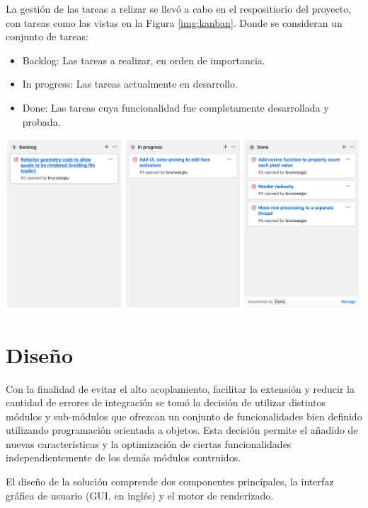 La gestión de las tareas a relizar se llevó a cabo en el respositiorio del proyecto, con tareas como las vistas en la Figura \ref{img:kanban}. Donde se consideran un conjunto de tareas:

\begin{itemize}
	\item Backlog: Las tareas a realizar, en orden de importancia.
	\item In progress: Las tareas actualmente en desarrollo.
	\item Done: Las tareas cuya funcionalidad fue completamente desarrollada y probada.
\end{itemize}

\vspace{5mm}
\begin{minipage}[h]{0.8\linewidth}
	\centering
	\includegraphics[width=\linewidth]{assets/kanban}
	\label{img:kanban}
\end{minipage}

\section{Diseño}
\label{sec:disenio}

Con la finalidad de evitar el alto acoplamiento, facilitar la extensión y reducir la cantidad de errores de integración se tomó la decisión de utilizar distintos módulos y sub-módulos que ofrezcan un conjunto de funcionalidades bien definido utilizando programación orientada a objetos. Esta decisión permite el añadido de nuevas características y la optimización de ciertas funcionalidades independientemente de los demás módulos contruidos.

El diseño de la solución comprende dos componentes principales, la interfaz gráfica de usuario (GUI, en inglés) y el motor de renderizado.

